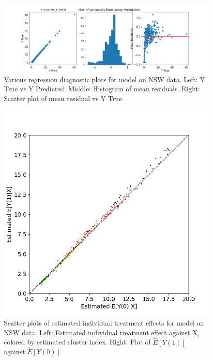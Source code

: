 \documentclass{article}
\begin{document}
\begin{figure}[H]
  \centering
  \includegraphics[width=1\textwidth]{Plots/NSW_diagnostics.png}
  \caption{Various regression diagnostic plots for model on NSW data. Left: Y True vs Y Predicted. Middle: Histogram of mean residuals. Right: Scatter plot of mean residual vs Y True}
  \label{fig:nsw_diag_plots}
\end{figure}

\begin{figure}[H]
  \centering
  \includegraphics[width=1\textwidth]{Plots/NSW_output_scatted.png}
  \caption{Scatter plots of estimated individual treatment effects for model on NSW data. Left: Estimated individual treatment effect against X, colored by estimated cluster index. Right: Plot of $\hat{E}[Y(1)]$ against $\hat{E}[Y(0)]$}
  \label{fig:nsw_scatter_plots}
\end{figure}
\end{document}
